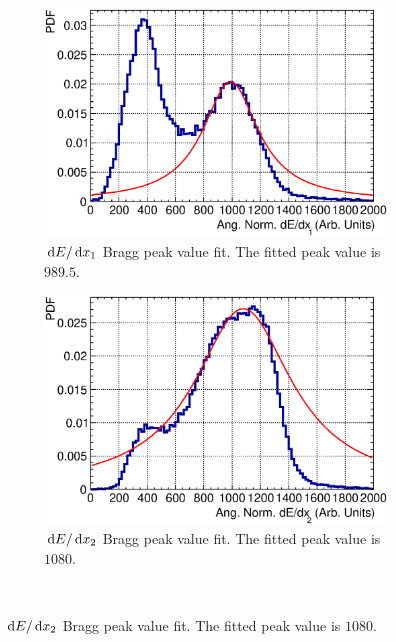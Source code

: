   \begin{figure}[ht]
    \centering
    \begin{subfigure}{\dbfigwid\textwidth}
         \includegraphics[width=\textwidth]{figures/sel/fig54a.eps}
         \caption{$\,\textrm{d}E/\,\textrm{d}x_1$ Bragg peak value fit. The fitted peak value is $989.5$.}
         \label{subfig:dedx0-peak}
    \end{subfigure}
    \begin{subfigure}{\dbfigwid\textwidth}
         \includegraphics[width=\textwidth]{figures/sel/fig54b.eps}
         \caption{$\,\textrm{d}E/\,\textrm{d}x_2$ Bragg peak value fit. The fitted peak value is $1080$.}
         \label{subfig:dedx1-peak}
    \end{subfigure}
    \\

\end{figure}
